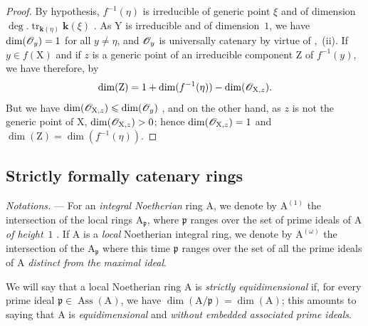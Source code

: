 \begin{proof}
By hypothesis, $f^{-1}(\eta)$ is irreducible of generic point $\xi$ and of dimension $\deg.\operatorname{tr}_{\boldsymbol{k}(\eta)}\boldsymbol{k}(\xi)$ .
As $\mathrm{Y}$ is irreducible and of dimension~$1$, we have $\dim(\mathscr{O}_y)=1$ for all $y\neq\eta$, and $\mathscr{O}_y$ is universally catenary by virtue of ,~(ii).
If $y\in f(\mathrm{X})$ and if $z$ is a generic point of an irreducible component $\mathrm{Z}$ of $f^{-1}(y)$, we have therefore, by 
\[
  \dim(\mathrm{Z})=1+\dim(f^{-1}(\eta))-\dim(\mathscr{O}_{\mathrm{X},z}).
\]
But we have $\dim(\mathscr{O}_{\mathrm{X},z})\leqslant\dim(\mathscr{O}_y)$ , and on the other hand, as $z$ is not the generic point of $\mathrm{X}$, $\dim(\mathscr{O}_{\mathrm{X},z})>0$; hence $\dim(\mathscr{O}_{\mathrm{X},z})=1$ and $\dim(\mathrm{Z})=\dim(f^{-1}(\eta))$.
\end{proof}


\newpage %
\subsection{Strictly formally catenary rings}
\label{subsection:IV.7.2}

\begin{env}[7.2.1]
\label{IV.7.2.1}
\emph{Notations.} ---
For an \emph{integral Noetherian} ring $\mathrm{A}$, we denote by $\mathrm{A}^{(1)}$ the intersection of the local rings $\mathrm{A}_\mathfrak{p}$, where $\mathfrak{p}$ ranges over the set of prime ideals of $\mathrm{A}$ \emph{of height}~$1$ .
If $\mathrm{A}$ is a \emph{local} Noetherian integral ring, we denote by $\mathrm{A}^{(\omega)}$ the intersection of the $\mathrm{A}_\mathfrak{p}$ where this time $\mathfrak{p}$ ranges over the set of all the prime ideals of $\mathrm{A}$ \emph{distinct from the maximal ideal}.

We will say that a local Noetherian ring $\mathrm{A}$ is \emph{strictly equidimensional} if, for every prime ideal $\mathfrak{p}\in\operatorname{Ass}(\mathrm{A})$, we have $\dim(\mathrm{A}/\mathfrak{p})=\dim(\mathrm{A})$; this amounts to saying that $\mathrm{A}$ is \emph{equidimensional} and \emph{without embedded associated prime ideals}.
\end{env}

